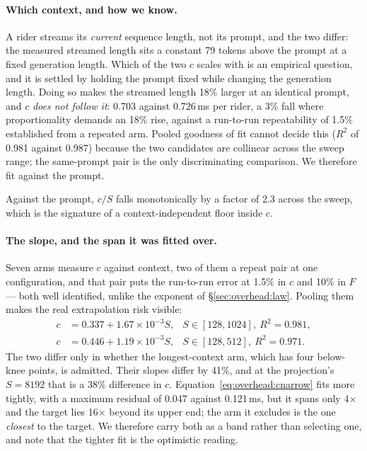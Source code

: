 \paragraph{Which context, and how we know.} A rider streams its \emph{current}
sequence length, not its prompt, and the two differ: the measured streamed
length sits a constant 79 tokens above the prompt at a fixed generation length.
Which of the two $c$ scales with is an empirical question, and it is settled by
holding the prompt fixed while changing the generation length. Doing so makes
the streamed length 18\% larger at an identical prompt, and $c$ \emph{does not
follow it}: 0.703 against 0.726\,ms per rider, a 3\% fall where proportionality
demands an 18\% rise, against a run-to-run repeatability of 1.5\% established
from a repeated arm. Pooled goodness of fit cannot decide this ($R^2$ of 0.981
against 0.987) because the two candidates are collinear across the sweep range;
the same-prompt pair is the only discriminating comparison. We therefore fit
against the prompt.

Against the prompt, $c/S$ falls monotonically by a factor of 2.3 across the
sweep, which is the signature of a context-independent floor inside $c$.

\paragraph{The slope, and the span it was fitted over.} Seven arms measure $c$
against context, two of them a repeat pair at one configuration, and that pair
puts the run-to-run error at 1.5\% in $c$ and 10\% in $F$ --- both well
identified, unlike the exponent of \S\ref{sec:overhead:law}. Pooling them makes
the real extrapolation risk visible:
\begin{align}
c &= 0.337 + 1.67\times10^{-3} S, & S \in [128, 1024],\ R^2 = 0.981,
\label{eq:overhead:cwide}\\
c &= 0.446 + 1.19\times10^{-3} S, & S \in [128, 512],\ R^2 = 0.971.
\label{eq:overhead:cnarrow}
\end{align}
The two differ only in whether the longest-context arm, which has four
below-knee points, is admitted. Their slopes differ by 41\%, and at the
projection's $S = 8192$ that is a 38\% difference in $c$.
Equation~\ref{eq:overhead:cnarrow} fits more tightly, with a maximum residual of
0.047 against 0.121\,ms, but it spans only 4$\times$ and the target lies
16$\times$ beyond its upper end; the arm it excludes is the one \emph{closest}
to the target. We therefore carry both as a band rather than selecting one, and
note that the tighter fit is the optimistic reading.

